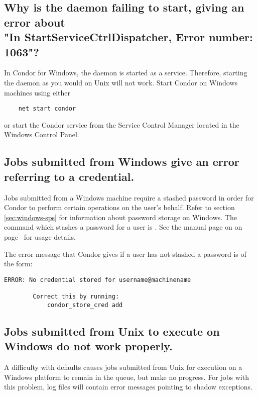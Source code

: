 \subsection*{Why is the  daemon failing to start, giving an error about\\
   	"In StartServiceCtrlDispatcher, Error number: 1063"?}
In Condor for Windows, the  daemon is started as a service.
Therefore,
starting the  daemon as you would on Unix will not work.
Start Condor on Windows machines using either
\begin{verbatim}
	net start condor
\end{verbatim}
or start the Condor service from the Service Control Manager located in
the Windows Control Panel.

\subsection*{Jobs submitted from Windows give an error referring to a credential.}

Jobs submitted from a Windows machine require a stashed password in
order for Condor to perform certain operations on the user's behalf.
Refer to section \ref{sec:windows-sps} for information about password
storage on Windows.  The command which stashes a password for a user
is .  See the manual page on on
page~\pageref{man-condor-store-cred} for usage details.

The error message that Condor gives if a user has not stashed a
password is of the form:
\footnotesize
\begin{verbatim}
ERROR: No credential stored for username@machinename

        Correct this by running:
	        condor_store_cred add
\end{verbatim}
\normalsize

\subsection*{Jobs submitted from Unix to execute on Windows do not work properly.}

A difficulty with defaults causes jobs submitted from Unix for execution
on a Windows platform to remain in the queue, but make no progress.
For jobs with this problem, log files will contain error messages
pointing to shadow exceptions.

